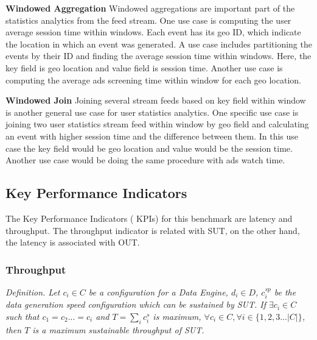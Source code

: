 \documentclass{vldb}
\begin{document}
\textbf{Windowed Aggregation}
Windowed aggregations are important part of the statistics analytics from the feed stream. One use case is computing the user average session time within windows. Each event has its geo ID, which indicate the location in which an event was generated. A use case includes partitioning the events by their ID and finding the average session time within windows. Here, the key field is geo location and value field is session time. Another use case is computing the average ads screening time within window for each geo location. 

\textbf{Windowed Join}
Joining several stream feeds based on key field within window is another general use case for user statistics analytics. One specific use case is joining two user statistics stream feed within window by geo field and calculating an event with higher session time and the difference between them. In this use case the key field would be geo location and value would be the session time. Another use case would be doing the same procedure with ads watch time. 


\subsection{Key Performance Indicators}
The Key Performance Indicators ( KPIs) for this benchmark are latency and throughput. The throughput indicator is related with SUT, on the other hand, the latency is associated with OUT. 


%


\subsubsection{Throughput}
\textit{Definition.  Let $c_{i} \in C$ be a configuration for a Data Engine, $d_{i} \in D$,  $c_{i}^{sp}$ be the data generation speed configuration which can be sustained by SUT. If  $\exists c_{i} \in C$ such that $c_{1} = c_{2}... = c_{i}$ and  $T = \sum_{i}c_{i}^{s}$ is maximum, $\forall c_{i} \in C, \forall i \in \{1,2,3 ... |C|\}$, then $T$ is a maximum sustainable throughput of SUT.}
\end{document}
